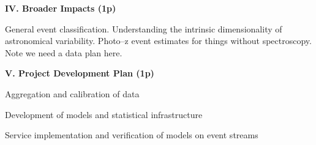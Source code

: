  \smallskip

\bigskip \centerline{\bf IV. Broader Impacts (1p)} \smallskip {}

General event classification.  Understanding the intrinsic dimensionality of
astronomical variability. Photo--z event estimates for things without
spectroscopy.  Note we need a data plan here.

\bigskip \centerline{\bf V. Project Development Plan (1p)} \smallskip

 \smallskip

Aggregation and calibration of data

 \smallskip

Development of models and statistical infrastructure

 \smallskip

Service implementation and verification of models on event streams

